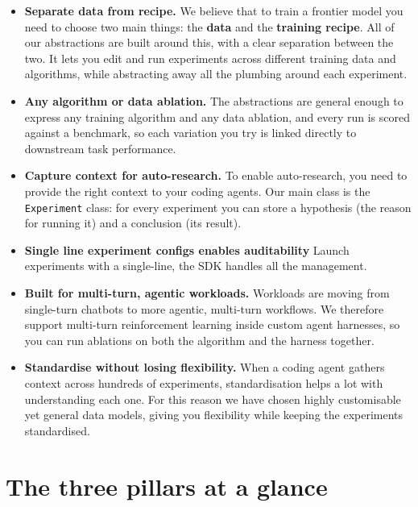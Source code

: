 \documentclass[11pt]{article}
\newcommand{\code}[1]{\texttt{\small #1}}
\begin{document}
\begin{itemize}
  \item \textbf{Separate data from recipe.} We believe that to train a frontier
    model you need to choose two main things: the \textbf{data} and the
    \textbf{training recipe}. All of our abstractions are built around this, with
    a clear separation between the two. It lets you edit and run experiments
    across different training data and algorithms, while abstracting away all the
    plumbing around each experiment.
  \item \textbf{Any algorithm or data ablation.} The
    abstractions are general enough to express any training algorithm and any
    data ablation, and every run is scored against a benchmark, so each variation
    you try is linked directly to downstream task performance.
  \item \textbf{Capture context for auto-research.} To enable auto-research, you
    need to provide the right context to your coding agents. Our main class is
    the \code{Experiment} class: for every experiment you can store a hypothesis
    (the reason for running it) and a conclusion (its result).

    \item \textbf{Single line experiment configs enables auditability} Launch experiments with a single-line, the SDK handles all the management. 
    
  \item \textbf{Built for multi-turn, agentic workloads.} Workloads are moving
    from single-turn chatbots to more agentic, multi-turn workflows. We therefore
    support multi-turn reinforcement learning inside custom agent harnesses, so
    you can run ablations on both the algorithm and the harness together.
  \item \textbf{Standardise without losing flexibility.} When a coding agent
    gathers context across hundreds of experiments, standardisation helps a lot
    with understanding each one. For this reason we have chosen highly
    customisable yet general data models, giving you flexibility while keeping
    the experiments standardised.

    
\end{itemize}

\section{The three pillars at a glance}
\end{document}
